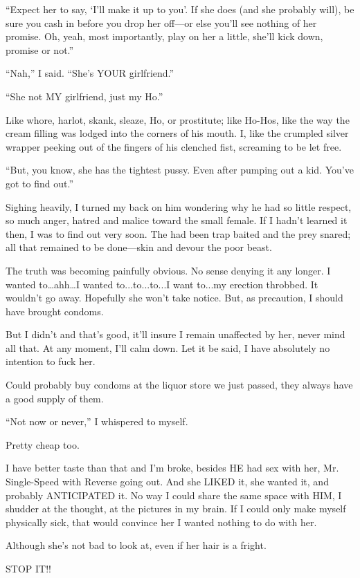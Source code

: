 ``Expect her to say, `I'll make it up to you'. If she does (and she
probably will), be sure you cash in before you drop her off---or else
you'll see nothing of her promise. Oh, yeah, most importantly, play on
her a little, she'll kick down, promise or not.''

``Nah,'' I said. ``She's YOUR girlfriend.''

``She not MY girlfriend, just my Ho.''

Like whore, harlot, skank, sleaze, Ho, or prostitute; like Ho-Hos, like
the way the cream filling was lodged into the corners of his mouth. I,
like the crumpled silver wrapper peeking out of the fingers of his
clenched fist, screaming to be let free.

``But, you know, she has the tightest pussy. Even after pumping out a
kid. You've got to find out.''

Sighing heavily, I turned my back on him wondering why he had so little
respect, so much anger, hatred and malice toward the small female. If I
hadn't learned it then, I was to find out very soon. The had been trap
baited and the prey snared; all that remained to be done---skin and
devour the poor beast.

The truth was becoming painfully obvious. No sense denying it any
longer. I wanted to\ldots ahh\ldots I wanted to...to...to...I want
to...my erection throbbed. It wouldn't go away. Hopefully she won't take
notice. But, as precaution, I should have brought condoms.

But I didn't and that's good, it'll insure I remain unaffected by her,
never mind all that. At any moment, I'll calm down. Let it be said, I
have absolutely no intention to fuck her.

Could probably buy condoms at the liquor store we just passed, they
always have a good supply of them.

``Not now or never,'' I whispered to myself.

Pretty cheap too.

I have better taste than that and I'm broke, besides HE had sex with
her, Mr. Single-Speed with Reverse going out. And she LIKED it, she
wanted it, and probably ANTICIPATED it. No way I could share the same
space with HIM, I shudder at the thought, at the pictures in my brain.
If I could only make myself physically sick, that would convince her I
wanted nothing to do with her.

Although she's not bad to look at, even if her hair is a fright.

STOP IT!!

